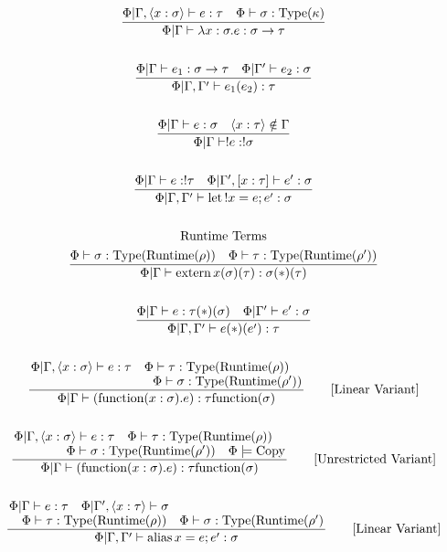 \documentclass {article}
\begin{document}
\begin{gather*}
\frac
{\Phi | \Gamma, \langle x : \sigma \rangle \vdash e : \tau \quad \Phi \vdash \sigma : \text{Type} (\kappa)}
{\Phi | \Gamma \vdash \lambda x:\sigma. e : \sigma \to \tau } \\
\\
\frac
{\Phi | \Gamma \vdash e_1 : \sigma \to \tau \quad \Phi | \Gamma' \vdash e_2 : \sigma}
{\Phi | \Gamma, \Gamma' \vdash e_1(e_2) : \tau} \\
\\
\frac
{\Phi | \Gamma \vdash e : \sigma \quad \langle x : \tau \rangle \notin \Gamma }
{\Phi | \Gamma \vdash !e : !\sigma } \\
\\
\frac
{\Phi | \Gamma \vdash e : !\tau \quad \Phi | \Gamma', [x : \tau] \vdash e' : \sigma }
{\Phi | \Gamma, \Gamma' \vdash \text{let} \, !x = e; e' : \sigma}  \\
\\
\text{Runtime Terms}
\\
\frac
{\Phi \vdash \sigma : \text{Type}(\text{Runtime} (\rho)) \quad \Phi \vdash \tau : \text{Type}(\text{Runtime} (\rho'))}
{\Phi | \Gamma \vdash \text{extern} \, x ( \sigma )(\tau) : \sigma (*)(\tau)} \\
\\
\frac
{\Phi | \Gamma \vdash e : \tau(*)(\sigma) \quad \Phi | \Gamma' \vdash e' : \sigma}
{\Phi | \Gamma, \Gamma' \vdash e(*)(e') : \tau} \\
\\
\frac
{\splitfrac
{\Phi | \Gamma, \langle x : \sigma \rangle \vdash e : \tau \quad \Phi \vdash \tau : \text{Type}(\text{Runtime}(\rho))}
{\Phi \vdash \sigma : \text{Type}(\text{Runtime}(\rho'))}}
{\Phi | \Gamma \vdash (\text{function}(x : \sigma). e) : \tau \text{function}(\sigma)  } \tag*{[Linear Variant]}\\
\\
\frac
{\splitfrac
{\Phi | \Gamma, \langle x : \sigma \rangle \vdash e : \tau \quad \Phi \vdash \tau : \text{Type}(\text{Runtime}(\rho))}
{\Phi \vdash \sigma : \text{Type}(\text{Runtime}(\rho')) \quad \Phi \models \text{Copy}}}
{\Phi | \Gamma \vdash (\text{function}(x : \sigma). e) : \tau \text{function}(\sigma)  } \tag*{[Unrestricted Variant]}\\
\\
\frac
{\splitfrac{ \Phi | \Gamma \vdash e : \tau \quad \Phi | \Gamma', \langle x : \tau \rangle \vdash \sigma}
{\Phi \vdash \tau : \text{Type}(\text{Runtime}(\rho)) \quad \Phi \vdash \sigma : \text{Type}(\text{Runtime}(\rho') }}
{\Phi | \Gamma, \Gamma' \vdash \text{alias} \, x = e; e' : \sigma} \tag*{[Linear Variant]} \\

\end{gather*}
\end{document}
